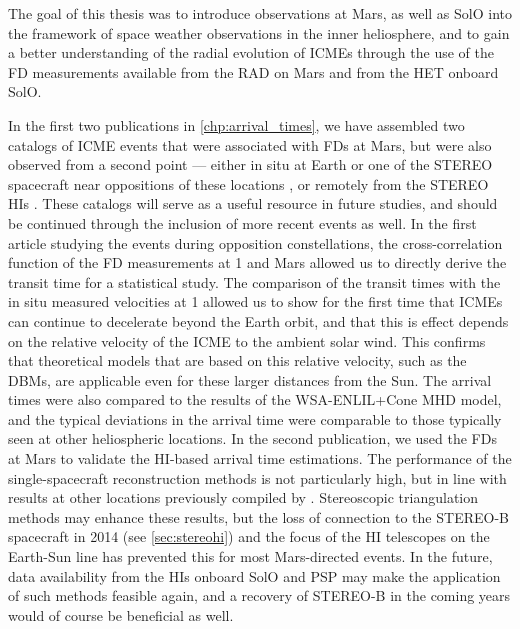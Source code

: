 The goal of this thesis was to introduce observations at Mars, as well as \ac{SolO} into the framework of space weather observations in the inner heliosphere, and to gain a better understanding of the radial evolution of \acp{ICME} through the use of the \ac{FD} measurements available from the \ac{RAD} on Mars and from the \ac{HET} onboard \ac{SolO}.

In the first two publications in \autoref{chp:arrival_times}, we have assembled two catalogs of \ac{ICME} events that were associated with \acp{FD} at Mars, but were also observed from a second point --- either in situ at Earth or one of the \ac{STEREO} spacecraft near oppositions of these locations \citep{Forstner-2018}, or remotely from the \ac{STEREO} \acp{HI} \citep{Forstner-2019}. These catalogs will serve as a useful resource in future studies, and should be continued through the inclusion of more recent events as well.
In the first article studying the events during opposition constellations, the cross-correlation function of the \ac{FD} measurements at \SI{1}{\AU} and Mars allowed us to directly derive the transit time for a statistical study. The comparison of the transit times with the in situ measured velocities at \SI{1}{\AU} allowed us to show for the first time that \acp{ICME} can continue to decelerate beyond the Earth orbit, and that this is effect depends on the relative velocity of the \ac{ICME} to the ambient solar wind. This confirms that theoretical models that are based on this relative velocity, such as the \acp{DBM}, are applicable even for these larger distances from the Sun. The arrival times were also compared to the results of the WSA-ENLIL+Cone \ac{MHD} model, and the typical deviations in the arrival time were comparable to those typically seen at other heliospheric locations.
In the second publication, we used the \acp{FD} at Mars to validate the \ac{HI}-based arrival time estimations. The performance of the single-spacecraft reconstruction methods is not particularly high, but in line with results at other locations previously compiled by \citet{Moestl-2017-HelcatsHSO}. Stereoscopic triangulation methods may enhance these results, but the loss of connection to the \ac{STEREO}-B spacecraft in 2014 (see \autoref{sec:stereohi}) and the focus of the \ac{HI} telescopes on the Earth-Sun line has prevented this for most Mars-directed events. In the future, data availability from the \acp{HI} onboard \ac{SolO} and \ac{PSP} may make the application of such methods feasible again, and a recovery of \ac{STEREO}-B in the coming years would of course be beneficial as well.


